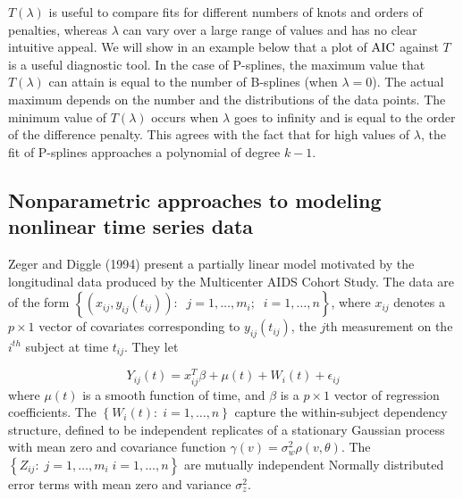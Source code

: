 \documentclass[12pt]{article}
\begin{document}
{{$T\left(\lambda\right)$ is useful to compare fits for different numbers of knots and orders of penalties, whereas $\lambda$ can vary over a large range of values and has no clear intuitive appeal. We will show in an example below that a plot of $\textup{AIC}$ against $T$ is a useful diagnostic tool. In the case of P-splines, the maximum value that $T\left(\lambda\right)$ can attain is equal to the number of B-splines (when $\lambda = 0$). The actual maximum depends on the number and the distributions of the data points. The minimum value of $T\left(\lambda\right)$ occurs when $\lambda$ goes to infinity and is equal to the order of the difference penalty. This agrees with the fact that for high values of $\lambda$, the fit of P-splines approaches a polynomial of degree $k - 1$.}



















\subsection{Nonparametric approaches to modeling nonlinear time series data}

Zeger and Diggle (1994) present a partially linear model motivated by the longitudinal data produced by the Multicenter AIDS Cohort Study. The data are of the form $\left\{ \left(x_{ij},y_{ij}\left(t_{ij}\right)\right): \;\; j=1,\dots,m_i;\;\;i=1,\dots,n \right\}$, where $x_{ij}$ denotes a $p \times 1$ vector of covariates corresponding to $y_{ij}\left(t_{ij}\right)$, the $j$th measurement on the $i^{th}$ subject at time $t_{ij}$. They let 

\begin{equation} \label{eq:zeger_diggle_VC_model}
Y_{ij}\left(t\right) =  x_{ij}^T\beta + \mu\left(t\right) + W_i\left(t\right) + \epsilon_{ij}
\end{equation}
\noindent
where $\mu\left(t\right)$ is a smooth function of time, and $\beta$ is a $p \times 1$ vector of regression coefficients. The $\left\{ W_i\left(t\right):\;i=1,\dots,n \right\}$ capture the within-subject dependency structure, defined to be independent replicates of a stationary Gaussian process with mean zero and covariance function $\gamma\left(v\right) = \sigma_w^2\rho\left(v, \theta \right)$. The $\left\{ Z_{ij}:\;j=1,\dots,m_i\;i=1,\dots,n \right\}$ are mutually independent Normally distributed error terms with mean zero and variance $\sigma_z^2$.

}
\end{document}
